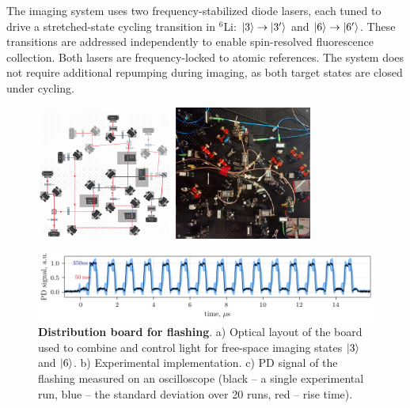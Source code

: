 


The imaging system uses two frequency-stabilized diode lasers, each tuned to drive a stretched-state cycling transition in ${}^6$Li: $\left| 3 \right\rangle \rightarrow \left| 3' \right\rangle$ and $\left| 6 \right\rangle \rightarrow \left| 6' \right\rangle$. These transitions are addressed independently to enable spin-resolved fluorescence collection. Both lasers are frequency-locked to atomic references. The system does not require additional repumping during imaging, as both target states are closed under cycling.


\begin{figure}
    \centering
     \phantom{4}
    \includegraphics[width=0.4\textwidth]{fig-ai/flashing-distribution-scheme.pdf}
    \hspace{10 mm} 
     \phantom{4}
    \includegraphics[width=0.4\textwidth]{imgs/flashing-distribution-img.jpg}

    \includegraphics{fig-py/flashing-oscilloscope.pdf}

    \caption[Distribution board for flashing]{
        \textbf{Distribution board for flashing}. 
        a) Optical layout of the board used to combine and control light for free-space imaging states $\left| 3 \right\rangle$ and $\left| 6 \right\rangle$.
        b) Experimental implementation.
        c) PD signal of the flashing measured on an oscilloscope (black -- a single experimental run, blue -- the standard deviation over 20 runs, red -- rise time).
    }
    \label{fig:flashing}
\end{figure}

